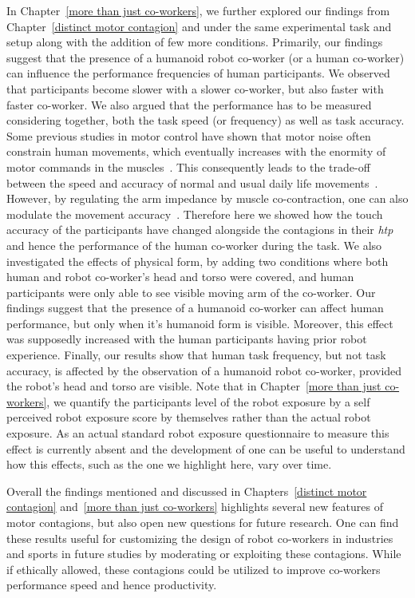 In Chapter~\ref{more than just co-workers}, we further explored our findings from Chapter~\ref{distinct motor contagion} and under the same experimental task and setup along with the addition of few more conditions. Primarily, our findings suggest that the presence of a humanoid robot co-worker (or a human co-worker) can influence the performance frequencies of human participants. We observed that participants become slower with a slower co-worker, but also faster with faster co-worker. We also argued that the performance has to be measured considering together, both the task speed (or frequency) as well as task accuracy. Some previous studies in motor control have shown that motor noise often constrain human movements, which eventually increases with the enormity of motor commands in the muscles~\cite{Harris:Nature:1998}. This consequently leads to the trade-off between the speed and accuracy of normal and usual daily life movements~\cite{Fitts:JEP:1954}. However, by regulating the arm impedance by muscle co-contraction, one can also modulate the movement accuracy~\cite{Burdet:nature:2001, Franklin:JoN:2008, Ganesh:RAS:2013}. Therefore here we showed how the touch accuracy of the participants have changed alongside the contagions in their {\it htp} and hence the performance of the human co-worker during the task. We also investigated the effects of physical form, by adding two conditions where both human and robot co-worker's head and torso were covered, and human participants were only able to see visible moving arm of the co-worker. Our findings suggest that the presence of a humanoid co-worker can affect human performance, but only when it's humanoid form is visible. Moreover, this effect was supposedly increased with the human participants having prior robot experience. Finally, our results show that human task frequency, but not task accuracy, is affected by the observation of a humanoid robot co-worker, provided the robot's head and torso are visible. Note that in Chapter~\ref{more than just co-workers}, we quantify the participants level of the robot exposure by a self perceived robot exposure score by themselves rather than the actual robot exposure. As an actual standard robot exposure questionnaire to measure this effect is currently absent and the development of one can be useful to understand how this effects, such as the one we highlight here, vary over time.

Overall the findings mentioned and discussed in Chapters~\ref{distinct motor contagion} and~\ref{more than just co-workers} highlights several new features of motor contagions, but also open new questions for future research. One can find these results useful for customizing the design of robot co-workers in industries and sports in future studies by moderating or exploiting these contagions. While if ethically allowed, these contagions could be utilized to improve co-workers performance speed and hence productivity.




